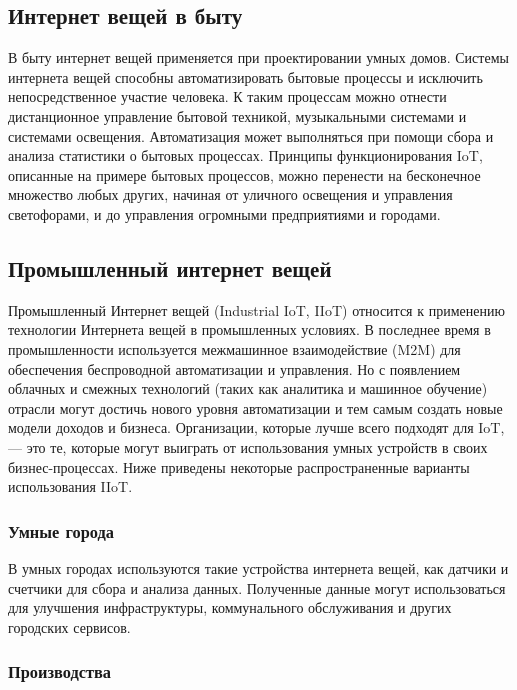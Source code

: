 \subsection{Интернет вещей в быту}

В быту интернет вещей применяется при проектировании умных домов. Системы интернета вещей способны автоматизировать бытовые процессы и исключить непосредственное участие человека. К таким процессам можно отнести дистанционное управление бытовой техникой, музыкальными системами и системами освещения. Автоматизация может выполняться при помощи сбора и анализа статистики о бытовых процессах. Принципы функционирования IoT, описанные на примере бытовых процессов, можно перенести на бесконечное множество любых других, начиная от уличного освещения и управления светофорами, и до управления огромными предприятиями и городами. \cite{Kaspersky}

\subsection{Промышленный интернет вещей}

Промышленный Интернет вещей (Industrial IoT, IIoT) относится к применению технологии Интернета вещей в промышленных условиях. В последнее время в промышленности используется межмашинное взаимодействие (M2M) для обеспечения беспроводной автоматизации и управления. Но с появлением облачных и смежных технологий (таких как аналитика и машинное обучение) отрасли могут достичь нового уровня автоматизации и тем самым создать новые модели доходов и бизнеса. Организации, которые лучше всего подходят для IoT, --- это те, которые могут выиграть от использования умных устройств в своих бизнес-процессах. Ниже приведены некоторые распространенные варианты использования IIoT. \cite{Oracle}

\subsubsection{Умные города}

В умных городах используются такие устройства интернета вещей, как датчики и счетчики для сбора и анализа данных. Полученные данные могут использоваться для улучшения инфраструктуры, коммунального обслуживания и других городских сервисов.

\subsubsection{Производства}

